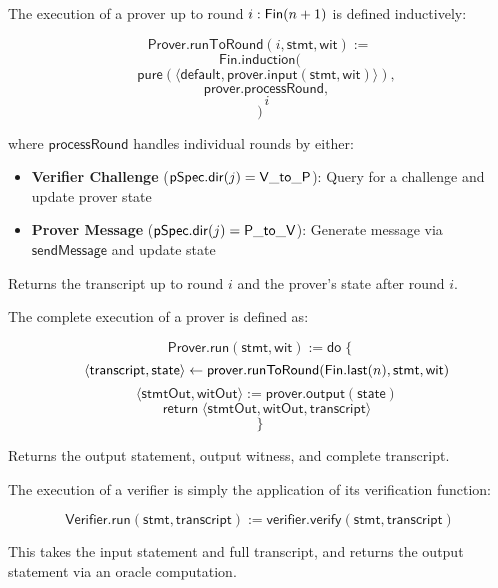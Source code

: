 \begin{definition}
    \label{def:prover_run_to_round}
    The execution of a prover up to round $i : \mathsf{Fin}(n+1)$ is defined inductively:

    \[ \mathsf{Prover}.\mathsf{runToRound}(i, \mathsf{stmt}, \mathsf{wit}) := \]
    \[ \mathsf{Fin}.\mathsf{induction}( \]
    \[ \quad \mathsf{pure}(\langle \mathsf{default}, \mathsf{prover}.\mathsf{input}(\mathsf{stmt}, \mathsf{wit}) \rangle), \]
    \[ \quad \mathsf{prover}.\mathsf{processRound}, \]
    \[ \quad i \]
    \[ ) \]

    where $\mathsf{processRound}$ handles individual rounds by either:
    \begin{itemize}
        \item \textbf{Verifier Challenge} ($\mathsf{pSpec}.\mathsf{dir}(j) = \mathsf{V\_to\_P}$): Query for a challenge and update prover state
        \item \textbf{Prover Message} ($\mathsf{pSpec}.\mathsf{dir}(j) = \mathsf{P\_to\_V}$): Generate message via $\mathsf{sendMessage}$ and update state
    \end{itemize}

    Returns the transcript up to round $i$ and the prover's state after round $i$.
\end{definition}

\begin{definition}
    \label{def:prover_run}
    The complete execution of a prover is defined as:

    \[ \mathsf{Prover}.\mathsf{run}(\mathsf{stmt}, \mathsf{wit}) := \mathsf{do} \; \{ \]
    \[ \quad \langle \mathsf{transcript}, \mathsf{state} \rangle \leftarrow \mathsf{prover}.\mathsf{runToRound}(\mathsf{Fin}.\mathsf{last}(n), \mathsf{stmt}, \mathsf{wit}) \]
    \[ \quad \langle \mathsf{stmtOut}, \mathsf{witOut} \rangle := \mathsf{prover}.\mathsf{output}(\mathsf{state}) \]
    \[ \quad \mathsf{return} \; \langle \mathsf{stmtOut}, \mathsf{witOut}, \mathsf{transcript} \rangle \]
    \[ \} \]

    Returns the output statement, output witness, and complete transcript.
\end{definition}

\begin{definition}
    \label{def:verifier_run}
    The execution of a verifier is simply the application of its verification function:

    \[ \mathsf{Verifier}.\mathsf{run}(\mathsf{stmt}, \mathsf{transcript}) := \mathsf{verifier}.\mathsf{verify}(\mathsf{stmt}, \mathsf{transcript}) \]

    This takes the input statement and full transcript, and returns the output statement via an oracle computation.
\end{definition}

